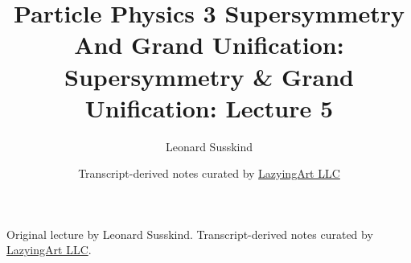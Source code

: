 \documentclass[11pt,oneside]{book}
\begin{document}
\frontmatter
\title{Particle Physics 3 Supersymmetry And Grand Unification: Supersymmetry \& Grand Unification: Lecture 5}
\author{Leonard Susskind}
\date{Transcript-derived notes curated by \href{https://lazying.art}{LazyingArt LLC}}
\maketitle
\begin{center}
\small Original lecture by Leonard Susskind. Transcript-derived notes curated by \href{https://lazying.art}{LazyingArt LLC}.
\end{center}
\clearpage
\mainmatter

\end{document}
